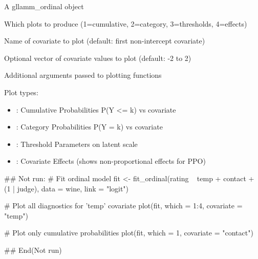 \documentclass[a4paper]{book}
\begin{document}
%
\begin{Arguments}
\begin{ldescription}
\item[\code{x}] A gllamm\_ordinal object

\item[\code{which}] Which plots to produce (1=cumulative, 2=category, 3=thresholds, 4=effects)

\item[\code{covariate}] Name of covariate to plot (default: first non-intercept covariate)

\item[\code{covariate\_values}] Optional vector of covariate values to plot (default: -2 to 2)

\item[\code{...}] Additional arguments passed to plotting functions
\end{ldescription}
\end{Arguments}
%
\begin{Details}
Plot types:
\begin{itemize}

\item{} : Cumulative Probabilities P(Y <= k) vs covariate
\item{} : Category Probabilities P(Y = k) vs covariate
\item{} : Threshold Parameters on latent scale
\item{} : Covariate Effects (shows non-proportional effects for PPO)

\end{itemize}

\end{Details}
%
\begin{Examples}
\begin{ExampleCode}
## Not run: 
# Fit ordinal model
fit <- fit_ordinal(rating ~ temp + contact + (1 | judge),
                   data = wine, link = "logit")

# Plot all diagnostics for 'temp' covariate
plot(fit, which = 1:4, covariate = "temp")

# Plot only cumulative probabilities
plot(fit, which = 1, covariate = "contact")

## End(Not run)

\end{ExampleCode}
\end{Examples}
\end{document}
